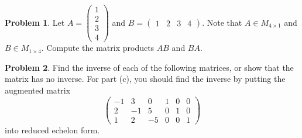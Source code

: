 \documentclass[11pt]{article}
\theoremstyle{definition}
\newtheorem{problem}{Problem}
\newenvironment{answer}{\par\bigskip\bgroup\color{darkblue}}{\egroup}
\begin{document}
\begin{answer}
\end{answer}




\begin{problem}
Let $A=\begin{pmatrix}1\\2\\3\\4\end{pmatrix}$ and $B=\begin{pmatrix}1&2&3&4\end{pmatrix}$.
Note that $A\in M_{4\times 1}$ and $B\in M_{1\times 4}$.  Compute the matrix products $AB$ and $BA$.
\end{problem}

\begin{answer}
\end{answer}




\begin{problem}
Find the inverse of each of the following matrices, or show that the matrix has no inverse.
For part (c), you should find the inverse by putting the augmented matrix
$$\left(\begin{array}{ccc|ccc}
 -1&3&0 & 1&0&0\\ 
 2&-1&5 & 0&1&0\\ 
 1&2&-5 & 0&0&1
\end{array}\right)$$
into reduced echelon form.

\bigskip
{}

\end{problem}


\begin{answer}
\end{answer}
\end{document}
